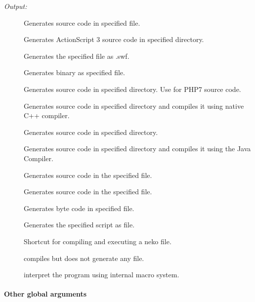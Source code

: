 \emph{Output:}

\begin{description}
	\item[] Generates  source code in specified file.
	\item[] Generates ActionScript 3 source code in specified directory.
	\item[] Generates the specified file as  .swf.
	\item[] Generates  binary as specified file.
	\item[] Generates  source code in specified directory. Use  for PHP7 source code.
	\item[] Generates  source code in specified directory and compiles it using native C++ compiler.
	\item[] Generates  source code in specified directory.
	\item[] Generates  source code in specified directory and compiles it using the Java Compiler.
	\item[] Generates  source code in the specified file.
	\item[] Generates  source code in the specified file.
	\item[] Generates  byte code in specified file.
	\item[] Generates the specified script as  file.
	\item[] Shortcut for compiling and executing a neko file.
	\item[] compiles but does not generate any file.
	\item[] interpret the program using internal macro system.
\end{description}

\paragraph{Other global arguments}

